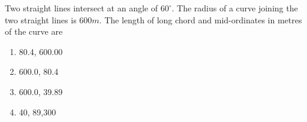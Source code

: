         \item{
        
        Two straight lines intersect at an angle of $60^\circ$. The radius of a curve joining the two straight lines is $600m$. The length of long chord and mid-ordinates in metres of the curve are
        \hfill
        
        \begin{multicols}{4}
        	\begin{enumerate}
        		\item 80.4, 600.00
        		\item 600.0, 80.4
        		\item 600.0, 39.89
        		\item 40, 89,300
        	\end{enumerate}
        \end{multicols}
        
        }



